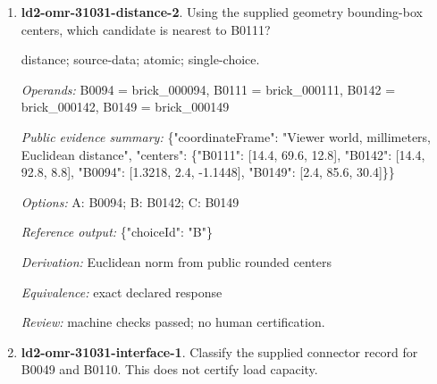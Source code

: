 \begin{enumerate}
\par{\small shape-match; visual; atomic; single-choice.\par\textit{Operands:} B0097 = brick\_000097, B0141 = brick\_000141, B0111 = brick\_000111, B0005 = brick\_000005, B0098 = brick\_000098\par\textit{Public evidence summary:} Numbered PNG: benchmark/ldraw-v2/inputs/views/ld2-omr-31031-shape-match-2.png; structured input = \{\}.\par\textit{Options:} A: B0141; B: B0005; C: B0098; D: B0097\par\textit{Reference output:} \{"choiceId": "A"\}\par\textit{Derivation:} source partNumber equality across labeled candidates; source oracle only\par\textit{Equivalence:} same source partNumber; ignore color and pose; perceptual equivalence pending\par\textit{Review:} pending required human review.}
\item \textbf{ld2-omr-31031-distance-2}. Using the supplied geometry bounding-box centers, which candidate is nearest to B0111?
\par{\small distance; source-data; atomic; single-choice.\par\textit{Operands:} B0094 = brick\_000094, B0111 = brick\_000111, B0142 = brick\_000142, B0149 = brick\_000149\par\textit{Public evidence summary:} \{"coordinateFrame": "Viewer world, millimeters, Euclidean distance", "centers": \{"B0111": [14.4, 69.6, 12.8], "B0142": [14.4, 92.8, 8.8], "B0094": [1.3218, 2.4, -1.1448], "B0149": [2.4, 85.6, 30.4]\}\}\par\textit{Options:} A: B0094; B: B0142; C: B0149\par\textit{Reference output:} \{"choiceId": "B"\}\par\textit{Derivation:} Euclidean norm from public rounded centers\par\textit{Equivalence:} exact declared response\par\textit{Review:} machine checks passed; no human certification.}
\item \textbf{ld2-omr-31031-interface-1}. Classify the supplied connector record for B0049 and B0110. This does not certify load capacity.

\end{enumerate}
